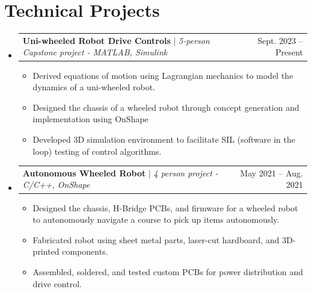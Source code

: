 \documentclass[letterpaper,11pt]{article}
\makeatletter
\newcommand{\resumeItem}[1]{
  \item\small{
    {#1 \vspace{-2pt}}
  }
}
\newcommand{\resumeProjectHeading}[2]{
    \item
    \begin{tabular*}{0.97\textwidth}{l@{\extracolsep{\fill}}r}
      \small#1 & #2 \\
    \end{tabular*}\vspace{-7pt}
}
\newcommand{\resumeSubHeadingListStart}{\begin{itemize}[leftmargin=0.15in, label={}]}
\newcommand{\resumeSubHeadingListEnd}{\end{itemize}}
\newcommand{\resumeItemListStart}{\begin{itemize}}
\newcommand{\resumeItemListEnd}{\end{itemize}\vspace{-5pt}}
\makeatother
\begin{document}
\section{Technical Projects}
    \resumeSubHeadingListStart
        \resumeProjectHeading
          {\textbf{Uni-wheeled Robot Drive Controls}
          $|$ \emph{5-person Capstone project - MATLAB, Simulink}
          }{Sept. 2023 -- Present}
          \resumeItemListStart
            \resumeItem{Derived equations of motion using Lagrangian mechanics to model the dynamics of a uni-wheeled robot.}
            \resumeItem{Designed the chassis of a wheeled robot through concept generation and implementation using OnShape}
            \resumeItem{Developed 3D simulation environment to facilitate SIL (software in the loop) testing of control algorithms.}
          \resumeItemListEnd
      \resumeProjectHeading
          {\textbf{Autonomous Wheeled Robot}
          $|$ \emph{4 person project - C/C++, OnShape}
          }{May 2021 -- Aug. 2021}
          \resumeItemListStart
            \resumeItem{Designed the chassis, H-Bridge PCBs, and firmware for a wheeled robot to autonomously navigate a course to pick up items autonomously.}
            \resumeItem{Fabricated robot using sheet metal parts, laser-cut hardboard, and 3D-printed components.}
            \resumeItem{Assembled, soldered, and tested custom PCBs for power distribution and drive control.}
          \resumeItemListEnd
    \resumeSubHeadingListEnd
\end{document}
